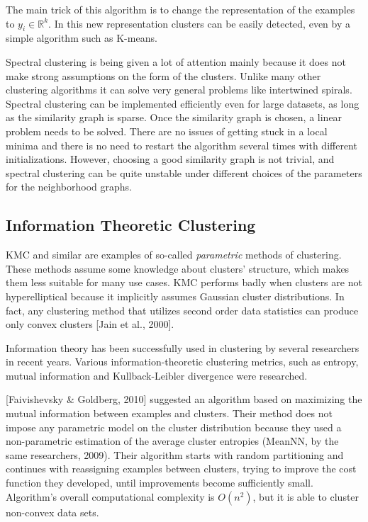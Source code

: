 \documentclass[conference]{IEEEtran}
\begin{document}
The main trick of this algorithm is to change the representation of the examples to $y_i \in \mathbb{R}^k$.
In this new representation clusters can be easily detected, even by a simple algorithm such as K-means.

Spectral clustering is being given a lot of attention mainly because it does not make strong
assumptions on the form of the clusters. Unlike many other clustering algorithms it
can solve very general problems like intertwined spirals.
Spectral clustering can be implemented efficiently even for large datasets, as long as
the similarity graph is sparse. Once the similarity graph is chosen, a linear problem needs to
be solved. There are no issues of getting stuck in a local minima and there is no need to
restart the algorithm several times with different initializations. However, choosing
a good similarity graph is not trivial, and spectral clustering can
be quite unstable under different choices of the parameters for the neighborhood graphs.

\subsection{Information Theoretic Clustering}%
KMC and similar are examples of so-called \textit{parametric} methods of clustering. These
methods assume some knowledge about clusters' structure, which makes them less
suitable for many use cases. KMC performs badly when clusters are not hyperelliptical
because it implicitly assumes Gaussian cluster distributions. In fact, any clustering method
that utilizes second order data statistics can produce only convex clusters [Jain et al., 2000].

Information theory has been successfully used in clustering by several researchers in recent years.
Various information-theoretic clustering metrics, such as entropy, mutual information and
Kullback-Leibler divergence were researched.

[Faivishevsky \& Goldberg, 2010] suggested an algorithm based on maximizing the mutual information
between examples and clusters. Their method does not impose any parametric model on the cluster
distribution because they used a non-parametric estimation of the average cluster entropies (MeanNN,
by the same researchers, 2009). Their algorithm starts with random partitioning and continues
with reassigning examples between clusters, trying to improve the cost function they developed,
until improvements become sufficiently small. Algorithm's overall computational complexity is
$O(n^2)$, but it is able to cluster non-convex data sets.
\end{document}
